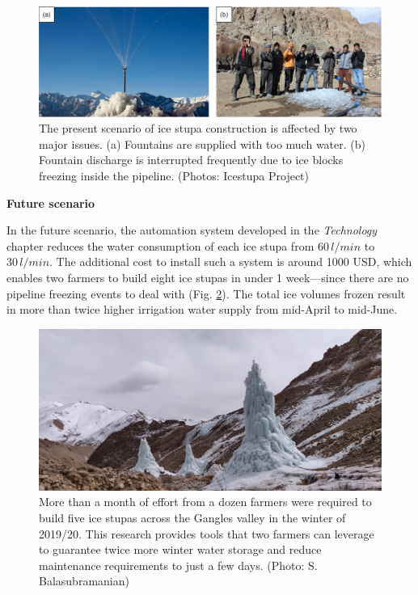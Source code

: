 \begin{figure}[htb]
	\includegraphics[width=\textwidth]{figs/construction_issues}

  \caption{The present scenario of ice stupa construction is affected by two major issues. (a) Fountains are
  supplied with too much water. (b) Fountain discharge is interrupted frequently due to ice blocks freezing
  inside the pipeline. (Photos: Icestupa Project)}

	\label{fig:issues}
\end{figure}

\textbf{Future scenario}

In the future scenario, the automation system developed in the \textit{Technology} chapter reduces the water
consumption of each ice stupa from $60\,l/min$ to $30\,l/min$. The additional cost to install such a system is
around 1000 USD, which enables two farmers to build eight ice stupas in under 1 week---since there are no pipeline freezing events to deal with (Fig. \ref{fig:icestupa_valley}). The total ice
volumes frozen result in more than twice higher irrigation water supply from mid-April to
mid-June.

\begin{figure}[htb]
	\includegraphics[width=\textwidth]{figs/icestupa_valley}

  \caption{More than a month of effort from a dozen farmers were required to build five ice stupas across the
  Gangles valley in the winter of 2019/20. This research provides tools that two farmers can leverage to
  guarantee twice more winter water storage and reduce maintenance requirements to just a few days. (Photo:
  S. Balasubramanian)}

	\label{fig:icestupa_valley}
\end{figure}


